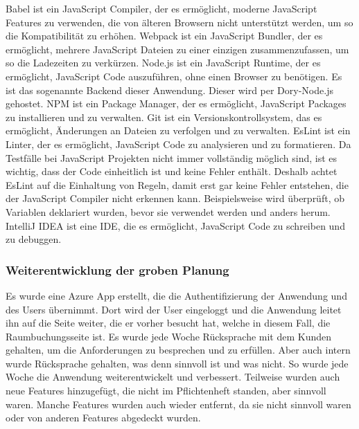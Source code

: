 \newline
\newline
Babel ist ein JavaScript Compiler, der es ermöglicht, moderne JavaScript Features zu verwenden, die von älteren Browsern nicht unterstützt werden, um so die Kompatibilität zu erhöhen.
\newline
\newline
Webpack ist ein JavaScript Bundler, der es ermöglicht, mehrere JavaScript Dateien zu einer einzigen zusammenzufassen, um so die Ladezeiten zu verkürzen.
\newline
\newline
Node.js ist ein JavaScript Runtime, der es ermöglicht, JavaScript Code auszuführen, ohne einen Browser zu benötigen.
Es ist das sogenannte Backend dieser Anwendung.
Dieser wird per Dory-Node.js gehostet.
\newline
\newline
NPM ist ein Package Manager, der es ermöglicht, JavaScript Packages zu installieren und zu verwalten.
\newline
\newline
Git ist ein Versionskontrollsystem, das es ermöglicht, Änderungen an Dateien zu verfolgen und zu verwalten.
\newline
\newline
EsLint ist ein Linter, der es ermöglicht, JavaScript Code zu analysieren und zu formatieren.
Da Testfälle bei JavaScript Projekten nicht immer vollständig möglich sind, ist es wichtig, dass der Code einheitlich ist und keine Fehler enthält.
Deshalb achtet EsLint auf die Einhaltung von Regeln, damit erst gar keine Fehler entstehen, die der JavaScript Compiler nicht erkennen kann.
Beispielsweise wird überprüft, ob Variablen deklariert wurden, bevor sie verwendet werden und anders herum.
\newline
\newline
IntelliJ IDEA ist eine IDE, die es ermöglicht, JavaScript Code zu schreiben und zu debuggen.
\newline
\newline

\subsubsection{Weiterentwicklung der groben Planung}
Es wurde eine Azure App erstellt, die die Authentifizierung der Anwendung und des Users übernimmt.
\newline
Dort wird der User eingeloggt und die Anwendung leitet ihn auf die Seite weiter, die er vorher besucht hat, welche in diesem Fall, die Raumbuchungsseite ist.
\newline
Es wurde jede Woche Rücksprache mit dem Kunden gehalten, um die Anforderungen zu besprechen und zu erfüllen.
Aber auch intern wurde Rücksprache gehalten, was denn sinnvoll ist und was nicht.
\newline
So wurde jede Woche die Anwendung weiterentwickelt und verbessert.
Teilweise wurden auch neue Features hinzugefügt, die nicht im Pflichtenheft standen, aber sinnvoll waren.
Manche Features wurden auch wieder entfernt, da sie nicht sinnvoll waren oder von anderen Features abgedeckt wurden.
\newline
\newline
